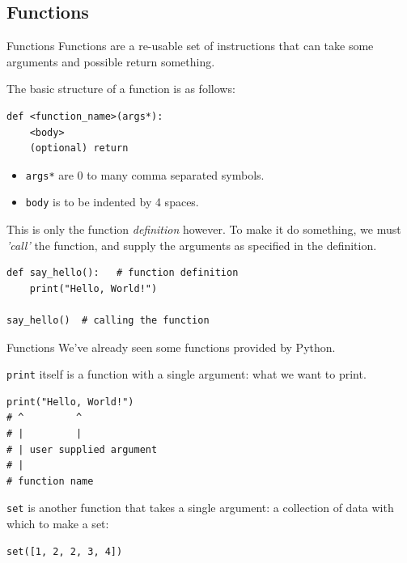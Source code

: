 \documentclass[10pt]{beamer}
\begin{document}
\subsection{Functions}
\label{sec:orgced59b6}
\begin{frame}[label={sec:org643a099},fragile]{Functions}
 Functions are a re-usable set of instructions that can take some arguments and
possible return something.

The basic structure of a function is as follows:

\begin{verbatim}
def <function_name>(args*):
    <body>
    (optional) return
\end{verbatim}

\begin{itemize}
\item \texttt{args*} are 0 to many comma separated symbols.
\item \texttt{body} is to be indented by 4 spaces.
\end{itemize}

This is only the function \emph{definition} however. To make it do something, we must \emph{'call'}
the function, and supply the arguments as specified in the definition.

\begin{verbatim}
def say_hello():   # function definition
    print("Hello, World!")

say_hello()  # calling the function
\end{verbatim}
\end{frame}

\begin{frame}[label={sec:org6c66990},fragile]{Functions}
 We've already seen some functions provided by Python.

\texttt{print} itself is a function with a single argument: what we want to print.

\begin{verbatim}
print("Hello, World!")
# ^         ^
# |         |
# | user supplied argument
# |
# function name 
\end{verbatim}

\texttt{set} is another function that takes a single argument: a collection of data with which
to make a set:

\begin{verbatim}
set([1, 2, 2, 3, 4])
\end{verbatim}
\end{frame}
\end{document}
